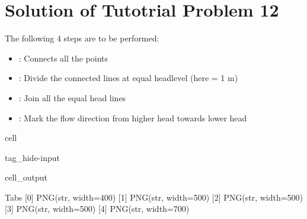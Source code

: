 \documentclass[letterpaper,10pt,english]{jupyterBook}
\begin{document}
\section{Solution of Tutotrial Problem 12}
\label{\detokenize{content/tutorials/T5/tutorial_05:solution-of-tutotrial-problem-12}}
\sphinxAtStartPar
The following 4 steps are to be performed:
\begin{itemize}
\item {} 
\sphinxAtStartPar
{}   : Connects all the points

\item {} 
\sphinxAtStartPar
{}  : Divide the connected lines at equal head\sphinxhyphen{}level (here = 1 m)

\item {} 
\sphinxAtStartPar
{} : Join all the equal head lines

\item {} 
\sphinxAtStartPar
{}  : Mark the flow direction from higher head towards lower head

\end{itemize}

\begin{sphinxuseclass}{cell}
\begin{sphinxuseclass}{tag_hide-input}\begin{sphinxVerbatimOutput}

\begin{sphinxuseclass}{cell_output}
\begin{sphinxVerbatim}[commandchars=\\\{\}]
Tabs
    [0] PNG(str, width=400)
    [1] PNG(str, width=500)
    [2] PNG(str, width=500)
    [3] PNG(str, width=500)
    [4] PNG(str, width=700)
\end{sphinxVerbatim}

\end{sphinxuseclass}\end{sphinxVerbatimOutput}

\end{sphinxuseclass}
\end{sphinxuseclass}
\end{document}

